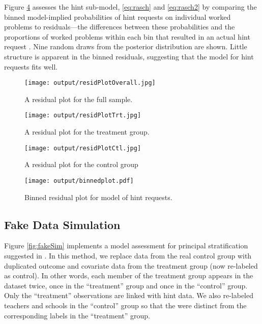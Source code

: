 \documentclass{article}\usepackage[]{graphicx}\usepackage[]{color}
\begin{document}
Figure \ref{fig:binnedResids} assesses the hint sub-model,
\eqref{eq:rasch} and \eqref{eq:rasch2} by comparing the binned model-implied
probabilities of hint requests on individual worked problems to residuals---the
differences between these probabilities and the proportions of worked
problems within each bin that resulted in an
actual hint request \citep[c.f.][]{gelman2014bayesian}.
Nine random draws from the posterior distribution are shown.
Little structure is apparent in the binned residuals, suggesting that
the model for hint requests fits well.

\begin{figure}[!h]
\centering
\texttt{[image: output/residPlotOverall.jpg]}
\caption{A residual plot for the full sample.}
\label{fig:residFull}
\end{figure}

\begin{figure}[!h]
\centering
\texttt{[image: output/residPlotTrt.jpg]}
\caption{A residual plot for the treatment group.}
\label{fig:residTrt}
\end{figure}

\begin{figure}[!h]
\centering
\texttt{[image: output/residPlotCtl.jpg]}
\caption{A residual plot for the control group}
\label{fig:residCtl}
\end{figure}

\begin{figure}[!h]
\centering
\texttt{[image: output/binnedplot.pdf]}
\caption{Binned residual plot for model of hint requests.}
\label{fig:binnedResids}
\end{figure}


\subsection{Fake Data Simulation}
Figure \ref{fig:fakeSim} implements a model assessment for principal
stratification suggested in \citet{aoas}.
In this method, we replace data from the real control group with duplicated
outcome and covariate data from the treatment group (now re-labeled as
control).
In other words, each member of the treatment group appears in the
dataset twice, once in the ``treatment'' group and once in the
``control'' group.
Only the ``treatment'' observations are linked with hint data.
We also re-labeled teachers and schools in the ``control'' group so
that the were distinct from the corresponding labels in the
``treatment'' group.
\end{document}
